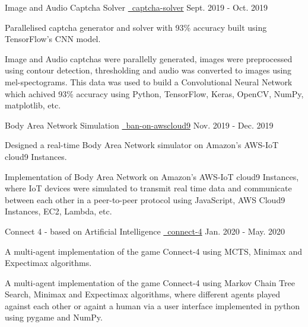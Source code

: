 \begin{cventries}
   \cvproject
    {Image and Audio Captcha Solver}
    {
    {}
    {\href{https://github.com/mukeshmk/image-audio-captcha}
    {\faGithubSquare\ captcha-solver}}
    }
    {Sept. 2019 - Oct. 2019}
    {
      \begin{cvitems}
      \vspace{-0.5ex}
        {
        \item {Parallelised captcha generator and solver with 93\% accuracy built using TensorFlow’s CNN model.}
        }
        {
        Image and Audio captchas were parallelly generated, images were preprocessed using contour detection, thresholding and audio was converted to images using mel-spectograms. This data was used to build a Convolutional Neural Network which achived 93\% accuracy using Python, TensorFlow, Keras, OpenCV, NumPy, matplotlib, etc.
        }
      \end{cvitems}
    }
  \cvproject
    {Body Area Network Simulation}
    {
    {}
    {\href{https://github.com/mukeshmk/ban-on-awscloud9}{\faGithubSquare\ ban-on-awscloud9}}
    }
    {Nov. 2019 - Dec. 2019}
    {
       \begin{cvitems}
       \vspace{-0.5ex}
        {
        \item{Designed a real-time Body Area Network simulator on Amazon's AWS-IoT cloud9 Instances.}
        }
        {
        Implementation of Body Area Network on Amazon's AWS-IoT cloud9 Instances, where IoT devices were simulated to transmit real time data and communicate between each other in a peer-to-peer protocol using JavaScript, AWS Cloud9 Instances, EC2, Lambda, etc.
        }
      \end{cvitems}
    }
  \cvproject
    {Connect 4 - based on Artificial Intelligence}
    {
    {}
    {\href{https://github.com/mukeshmk/connect-4}{\faGithubSquare\ connect-4}}
    }
    {Jan. 2020 - May. 2020}
    {
      \begin{cvitems}
      \vspace{-0.5ex}
      {
      \item {A multi-agent implementation of the game Connect-4 using MCTS, Minimax and Expectimax algorithms.} 
      }
      {
      A multi-agent implementation of the game Connect-4 using Markov Chain Tree Search, Minimax and Expectimax algorithms, where different agents played against each other or againt a human via a user interface implemented in python using pygame and NumPy.
}
\end{cvitems}}
\end{cventries}
